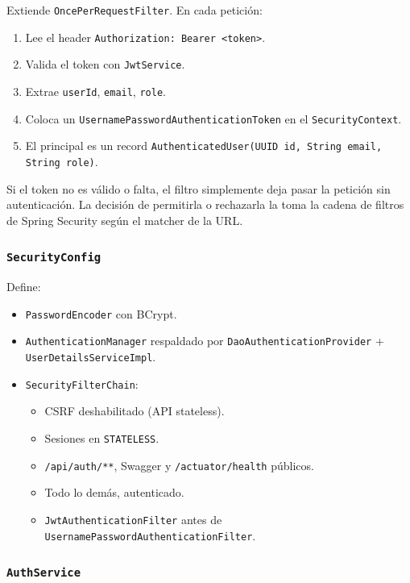 Extiende \texttt{OncePerRequestFilter}. En cada petición:
\begin{enumerate}[leftmargin=*]
  \item Lee el header \texttt{Authorization: Bearer <token>}.
  \item Valida el token con \texttt{JwtService}.
  \item Extrae \texttt{userId}, \texttt{email}, \texttt{role}.
  \item Coloca un \texttt{UsernamePasswordAuthenticationToken} en el \texttt{SecurityContext}.
  \item El principal es un record \texttt{AuthenticatedUser(UUID id, String email, String role)}.
\end{enumerate}

\begin{nota}[Nota]
Si el token no es válido o falta, el filtro simplemente deja pasar la petición sin autenticación. La decisión de permitirla o rechazarla la toma la cadena de filtros de Spring Security según el matcher de la URL.
\end{nota}

\subsubsection{\texttt{SecurityConfig}}

Define:
\begin{itemize}[leftmargin=*]
  \item \texttt{PasswordEncoder} con BCrypt.
  \item \texttt{AuthenticationManager} respaldado por \texttt{DaoAuthenticationProvider} + \texttt{UserDetailsServiceImpl}.
  \item \texttt{SecurityFilterChain}:
    \begin{itemize}
      \item CSRF deshabilitado (API stateless).
      \item Sesiones en \texttt{STATELESS}.
      \item \texttt{/api/auth/**}, Swagger y \texttt{/actuator/health} públicos.
      \item Todo lo demás, autenticado.
      \item \texttt{JwtAuthenticationFilter} antes de \texttt{UsernamePasswordAuthenticationFilter}.
    \end{itemize}
\end{itemize}

\subsubsection{\texttt{AuthService}}

